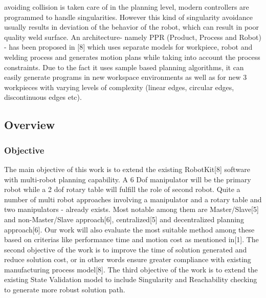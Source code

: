 avoiding collision is taken care of in the planning level, modern controllers are programmed to
handle singularities. However this kind of singularity avoidance usually results in deviation of the
behavior of the robot, which can result in poor quality weld surface.
An architecture- namely PPR (Product, Process and Robot) - has been proposed in [8] which uses
separate models for workpiece, robot and welding process and generates motion plans while
taking into account the process constraints. Due to the fact it uses sample based planning
algorithms, it can easily generate programs in new workspace environments as well as for new
3
workpieces with varying levels of complexity (linear edges, circular edges, discontinuous edges
etc).
\subsection{Overview}
\subsubsection{Objective}
The main objective of this work is to extend the existing RobotKit[8] software with multi-robot
planning capability. A 6 Dof manipulator will be the primary robot while a 2 dof rotary table will fulfill the role of second robot. Quite a number of multi robot approaches involving a
manipulator and a rotary table and two manipulators - already exists. Most notable among them
are Master/Slave[5] and non-Master/Slave approach[6], centralized[5] and decentralized
planning approach[6]. Our work will also evaluate the most suitable method among these based
on criterias like performance time and motion cost as mentioned in[1].
The second objective of the work is to improve the time of solution generated and reduce
solution cost, or in other words ensure greater compliance with existing manufacturing process
model[8].
The third objective of the work is to extend the existing State Validation model to include
Singularity and Reachability checking to generate more robust solution path.
